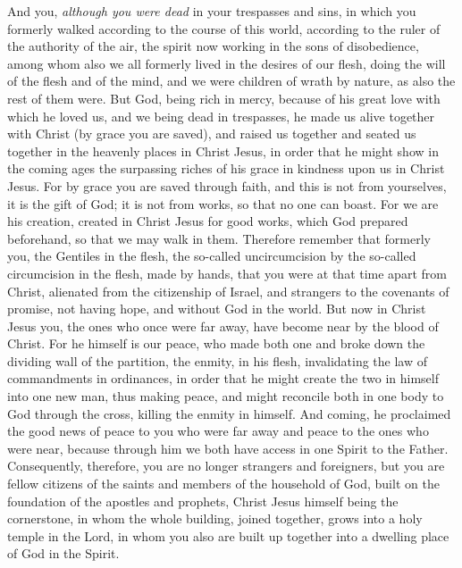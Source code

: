 \begin{biblechapter} %
 And you, \textit{although you were dead} in your trespasses and sins,
\verse in which you formerly walked according to the course of this world, according to the ruler of the authority of the air, the spirit now working in the sons of disobedience,
\verse among whom also we all formerly lived in the desires of our flesh, doing the will of the flesh and of the mind, and we were children of wrath by nature, as also the rest of them were.
\verse But God, being rich in mercy, because of his great love with which he loved us,
\verse and we being dead in trespasses, he made us alive together with Christ (by grace you are saved),
\verse and raised us together and seated us together in the heavenly places in Christ Jesus,
\verse in order that he might show in the coming ages the surpassing riches of his grace in kindness upon us in Christ Jesus.
\verse For by grace you are saved through faith, and this is not from yourselves, it is the gift of God;
\verse it is not from works, so that no one can boast.
\verse For we are his creation, created in Christ Jesus for good works, which God prepared beforehand, so that we may walk in them.
 Therefore remember that formerly you, the Gentiles in the flesh, the so-called uncircumcision by the so-called circumcision in the flesh, made by hands,
\verse that you were at that time apart from Christ, alienated from the citizenship of Israel, and strangers to the covenants of promise, not having hope, and without God in the world.
\verse But now in Christ Jesus you, the ones who once were far away, have become near by the blood of Christ.
\verse For he himself is our peace, who made both one and broke down the dividing wall of the partition, the enmity, in his flesh,
\verse invalidating the law of commandments in ordinances, in order that he might create the two in himself into one new man, thus making peace,
\verse and might reconcile both in one body to God through the cross, killing the enmity in himself.
\verse And coming, he proclaimed the good news of peace to you who were far away and peace to the ones who were near,
\verse because through him we both have access in one Spirit to the Father.
\verse Consequently, therefore, you are no longer strangers and foreigners, but you are fellow citizens of the saints and members of the household of God,
\verse built on the foundation of the apostles and prophets, Christ Jesus himself being the cornerstone,
\verse in whom the whole building, joined together, grows into a holy temple in the Lord,
\verse in whom you also are built up together into a dwelling place of God in the Spirit.
\end{biblechapter}

